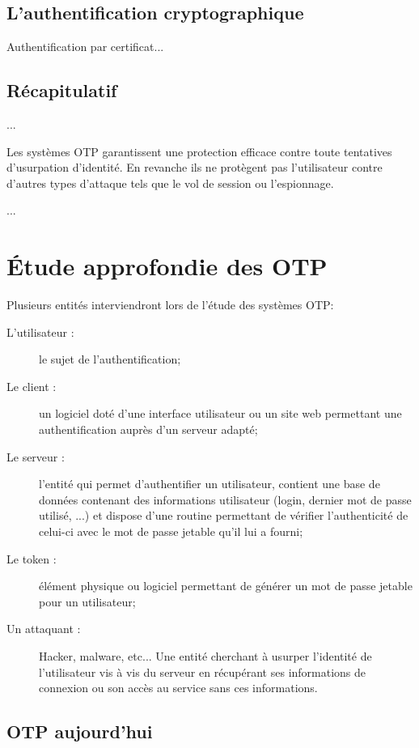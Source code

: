 \subsection{L'authentification cryptographique}

	Authentification par certificat...

\subsection{Récapitulatif}

	...
	
	Les systèmes OTP garantissent une protection efficace contre toute tentatives 
	d'usurpation d'identité. En revanche ils ne protègent pas l'utilisateur contre
	d'autres types d'attaque tels que le vol de session ou l'espionnage.
	
	...
	

\section{Étude approfondie des OTP}

	Plusieurs entités interviendront lors de l'étude des systèmes OTP:
	
	\begin{description}
		\item[L'utilisateur :] le sujet de l'authentification;
		\item[Le client :] un logiciel doté d'une interface utilisateur ou un site 
		web permettant une authentification auprès d'un serveur adapté;
		\item[Le serveur :] l'entité qui permet d'authentifier un utilisateur, 
		contient une base de données contenant des informations utilisateur (login, 
		dernier mot de passe utilisé, ...) et dispose d'une routine permettant de 
		vérifier l'authenticité de celui-ci avec le mot de passe jetable qu'il lui a 
		fourni;
		\item[Le token :] élément physique ou logiciel permettant de générer un mot 
		de passe jetable pour un utilisateur;
		\item[Un attaquant :] Hacker, malware, etc... Une entité cherchant à usurper 
		l'identité de l'utilisateur vis à vis du serveur en récupérant ses 
		informations de connexion ou son accès au service sans ces informations.
	\end{description}

\subsection{OTP aujourd'hui}
	
